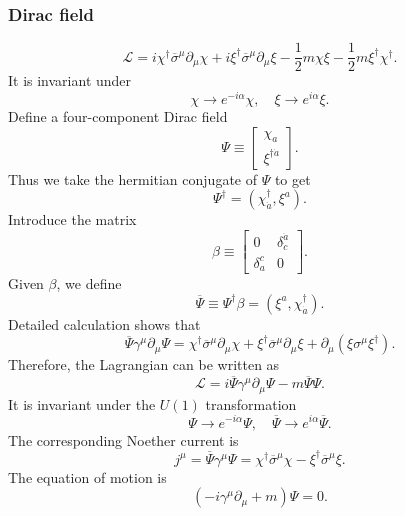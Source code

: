 \subsubsection{Dirac field}
\[\mathcal{L} = i \chi^{\dagger} \overline{\sigma}^{\mu} \partial_{\mu} \chi + i \xi^{\dagger} \overline{\sigma}^{\mu} \partial_{\mu} \xi- \frac{1}{2}m \chi\xi - \frac{1}{2}m \xi^{\dagger} \chi^{\dagger}.\]
It is invariant under
\[\chi \to e^{-i\alpha}\chi , \quad \xi \to e^{i\alpha}\xi.\]
Define a four-component Dirac field
\[\Psi \equiv \left[ \begin{matrix} \chi_a \\ \xi^{\dagger \dot{a}}\end{matrix} \right] .\]
Thus we take the hermitian conjugate of $\Psi$ to get
\[\Psi^{\dagger} = (\chi^{\dagger}_{\dot{a}}, \xi^{a}).\]
Introduce the matrix
\[\beta \equiv \left[ \begin{matrix} 0& \delta^{\dot{a}}_{\dot{c}}\\ \delta_a^{c}& 0\end{matrix} \right].\]
Given $\beta$, we define
\[\overline{\Psi} \equiv \Psi^{\dagger}\beta = (\xi^{a},\chi^{\dagger}_{\dot{a}}).\]
Detailed calculation shows that
\[\overline{\Psi} \gamma^{\mu} \partial_{\mu} \Psi =  \chi^{\dagger} \overline{\sigma}^{\mu} \partial_{\mu} \chi +  \xi^{\dagger} \overline{\sigma}^{\mu} \partial_{\mu} \xi + \partial_{\mu}( \xi \sigma^{\mu} \xi^{\dagger}).\]
Therefore, the Lagrangian can be written as
\[\mathcal{L} = i\overline{\Psi} \gamma^{\mu} \partial_{\mu} \Psi - m\overline{\Psi}\Psi.\]
It is invariant under the $U(1)$ transformation
\[\Psi \to e^{-i\alpha}\Psi , \quad \overline{\Psi} \to e^{i\alpha}\overline{\Psi}.\]
The corresponding Noether current is
\[j^{\mu} = \overline{\Psi}\gamma^{\mu}\Psi = \chi^{\dagger} \overline{\sigma}^{\mu}  \chi -  \xi^{\dagger} \overline{\sigma}^{\mu} \xi.\]
The equation of motion is
\[(-i\gamma^{\mu}\partial_{\mu}+m)\Psi=0.\]

